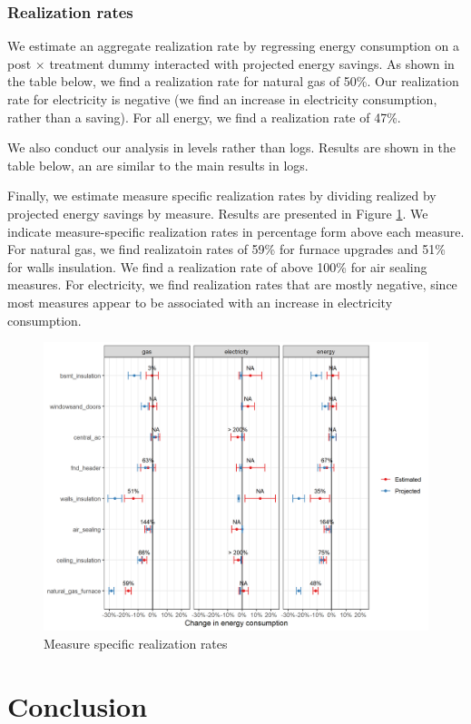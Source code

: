 \documentclass{article}
\begin{document}
\subsubsection{Realization rates}
We estimate an aggregate realization rate by regressing energy consumption on a post $\times$ treatment dummy interacted with projected energy savings. As shown in the table below, we find a realization rate for natural gas of 50\%. Our realization rate for electricity is negative (we find an increase in electricity consumption, rather than a saving). For all energy, we find a realization rate of 47\%.



We also conduct our analysis in levels rather than logs. Results are shown in the table below, an are similar to the main results in logs.



Finally, we estimate measure specific realization rates by dividing realized by projected energy savings by measure.  Results are presented in Figure \ref{fig_rr_mbm}. We indicate measure-specific realization rates in percentage form above each measure. For natural gas, we find realizatoin rates of 59\% for furnace upgrades and 51\% for walls insulation. We find a realization rate of above 100\% for air sealing measures. For electricity, we find realization rates that are mostly negative, since most measures appear to be associated with an increase in electricity consumption.

\begin{figure}
	\includegraphics[width=\linewidth]{../output_figures_tables/mbm_realization_rate.png}
	\caption{Measure specific realization rates}\label{fig_rr_mbm}
\end{figure}

\section{Conclusion}
\end{document}
